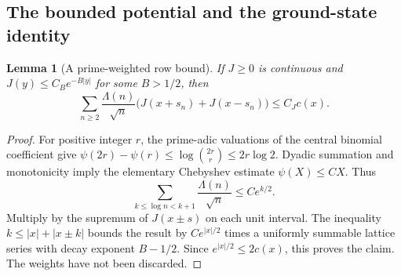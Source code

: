 \documentclass[11pt,a4paper]{article}
\newcommand{\abs}[1]{\lvert #1\rvert}
\newtheorem{lemma}[theorem]{Lemma}
\theoremstyle{definition}
\theoremstyle{remark}
\numberwithin{equation}{section}
\begin{document}
\subsection{The bounded potential and the ground-state identity}
\begin{lemma}[A prime-weighted row bound]\label{lem:prime-row}
If $J\ge0$ is continuous and $J(y)\le C_Be^{-B\abs y}$ for some
$B>1/2$, then
\begin{equation}\label{eq:prime-row}
 \sum_{n\ge2}\frac{\Lambda(n)}{\sqrt n}
       \bigl(J(x+s_n)+J(x-s_n)\bigr)\le C_J c(x).
\end{equation}
\end{lemma}
\begin{proof}
For positive integer $r$, the prime-adic valuations of the central
binomial coefficient give
$\psi(2r)-\psi(r)\le\log\binom{2r}{r}\le2r\log2$.
Dyadic summation and monotonicity imply the elementary Chebyshev estimate
$\psi(X)\le CX$. Thus
\[
 \sum_{k\le\log n<k+1}\frac{\Lambda(n)}{\sqrt n}\le Ce^{k/2}.
\]
Multiply by the supremum of $J(x\pm s)$ on each unit interval. The
inequality $k\le\abs x+\abs{x\pm k}$ bounds the result by $Ce^{\abs x/2}$
times a uniformly summable lattice series with decay exponent $B-1/2$.
Since $e^{\abs x/2}\le2c(x)$, this proves the claim. The weights have not
been discarded.
\end{proof}
\end{document}

